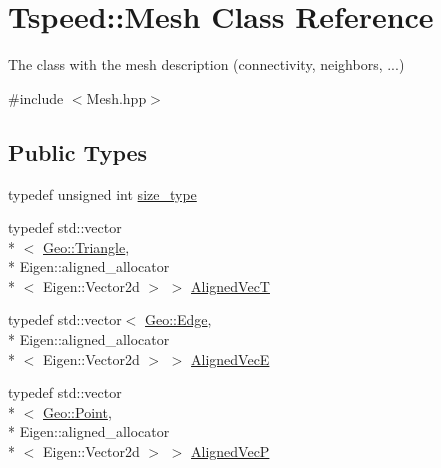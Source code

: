 \hypertarget{classTspeed_1_1Mesh}{\section{Tspeed\-:\-:Mesh Class Reference}
\label{classTspeed_1_1Mesh}
}


The class with the mesh description (connectivity, neighbors, ...)  




{\ttfamily \#include $<$Mesh.\-hpp$>$}

\subsection*{Public Types}
\begin{DoxyCompactItemize}
\item 
typedef unsigned int \hyperlink{classTspeed_1_1Mesh_a097181c50faa6c8cec5dbe135694606b}{size\-\_\-type}
\item 
typedef std\-::vector\\*
$<$ \hyperlink{classTspeed_1_1Geo_1_1Triangle}{Geo\-::\-Triangle}, \\*
Eigen\-::aligned\-\_\-allocator\\*
$<$ Eigen\-::\-Vector2d $>$ $>$ \hyperlink{classTspeed_1_1Mesh_ae62a59eea301689dd9f7c9663414db18}{Aligned\-Vec\-T}
\item 
typedef std\-::vector$<$ \hyperlink{classTspeed_1_1Geo_1_1Edge}{Geo\-::\-Edge}, \\*
Eigen\-::aligned\-\_\-allocator\\*
$<$ Eigen\-::\-Vector2d $>$ $>$ \hyperlink{classTspeed_1_1Mesh_a09031b0dab0f2efcef61981dfc9d1640}{Aligned\-Vec\-E}
\item 
typedef std\-::vector\\*
$<$ \hyperlink{classTspeed_1_1Geo_1_1Point}{Geo\-::\-Point}, \\*
Eigen\-::aligned\-\_\-allocator\\*
$<$ Eigen\-::\-Vector2d $>$ $>$ \hyperlink{classTspeed_1_1Mesh_aa8aac31131166087d192ef77c49fb5b2}{Aligned\-Vec\-P}
\end{DoxyCompactItemize}
